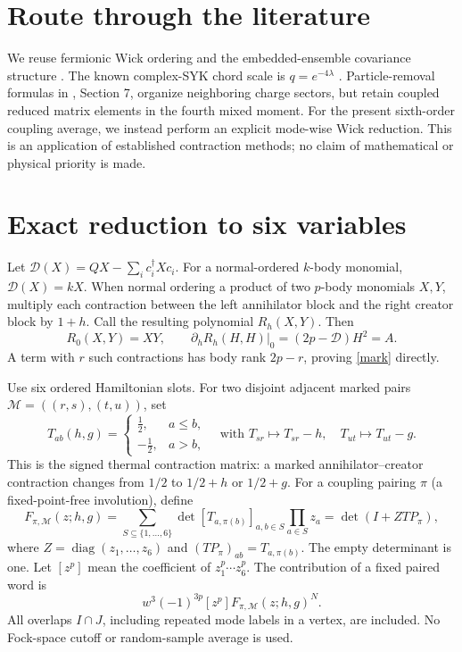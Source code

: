 \documentclass[11pt,a4paper]{article}
\begin{document}
\section{Route through the literature}
We reuse fermionic Wick ordering \cite{ferialdi} and the embedded-ensemble
covariance structure \cite{kota,kv}. The known complex-SYK chord scale is
$q=e^{-4\lambda}$ \cite{bnr}. Particle-removal formulas in \cite{kv},
Section 7, organize neighboring charge sectors, but retain coupled
reduced matrix elements in the fourth mixed moment. For the present
sixth-order coupling average, we instead perform an explicit mode-wise
Wick reduction. This is an application of established contraction methods;
no claim of mathematical or physical priority is made.

\newpage
\section{Exact reduction to six variables}
Let $\mathcal D(X)=QX-\sum_i c_i^\dagger Xc_i$.
For a normal-ordered $k$-body monomial, $\mathcal D(X)=kX$.
When normal ordering a product of two $p$-body monomials $X,Y$, multiply
each contraction between the left annihilator block and the right creator
block by $1+h$. Call the resulting polynomial $R_h(X,Y)$. Then
\begin{equation}
 R_0(X,Y)=XY,\qquad
 \left.\partial_h R_h(H,H)\right|_0=(2p-\mathcal D)H^2=A.\label{mark}
\end{equation}
A term with $r$ such contractions has body rank $2p-r$, proving
\eqref{mark} directly.

Use six ordered Hamiltonian slots. For two disjoint adjacent marked
pairs $\mathcal M=((r,s),(t,u))$, set
\begin{equation}
 T_{ab}(h,g)=
 \begin{cases}\tfrac12,&a\le b,\\-\tfrac12,&a>b,\end{cases}
 \quad\text{with }T_{sr}\mapsto T_{sr}-h,\quad T_{ut}\mapsto T_{ut}-g.
\end{equation}
This is the signed thermal contraction matrix: a marked annihilator--creator
contraction changes from $1/2$ to $1/2+h$ or $1/2+g$.
For a coupling pairing $\pi$ (a fixed-point-free involution), define
\begin{equation}
 F_{\pi,\mathcal M}(z;h,g)=
 \sum_{S\subseteq\{1,\ldots,6\}}
   \det[T_{a,\pi(b)}]_{a,b\in S}\prod_{a\in S}z_a
 =\det(I+ZT P_\pi),\label{poly}
\end{equation}
where $Z=\operatorname{diag}(z_1,\ldots,z_6)$ and
$(TP_\pi)_{ab}=T_{a,\pi(b)}$. The empty determinant is one.
Let $[z^p]$ mean the coefficient of $z_1^p\cdots z_6^p$.
The contribution of a fixed paired word is
\begin{equation}
 w^3(-1)^{3p}[z^p]F_{\pi,\mathcal M}(z;h,g)^N.\label{finiteword}
\end{equation}
All overlaps $I\cap J$, including repeated mode labels in a vertex,
are included. No Fock-space cutoff or random-sample average is used.
\end{document}
